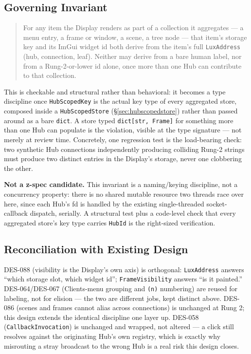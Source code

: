 \documentclass[a4paper,10pt]{article}
\begin{document}
\subsection{Governing Invariant}

\begin{quote}
For any item the Display renders as part of a collection it aggregates ---
a menu entry, a frame or window, a scene, a tree node --- that item's
storage key and its ImGui widget id both derive from the item's full
\texttt{LuxAddress} (hub, connection, leaf).  Neither may derive from a
bare human label, nor from a Rung-2-or-lower id alone, once more than one
Hub can contribute to that collection.
\end{quote}

This is checkable and structural rather than behavioral: it becomes a type
discipline once \texttt{HubScopedKey} is the actual key type of every
aggregated store, composed inside a \texttt{HubScopedStore}
(\S\ref{sec:hubscopedstore}) rather than passed around as a bare
\texttt{dict}.  A store typed \texttt{dict[str, Frame]} for something more
than one Hub can populate is the violation, visible at the type signature
--- not merely at review time.  Concretely, one regression test is the
load-bearing check: two synthetic Hub connections independently producing
colliding Rung-2 strings must produce two distinct entries in the
Display's storage, never one clobbering the other.

\textbf{Not a z-spec candidate.}  This invariant is a naming/keying
discipline, not a concurrency property: there is no shared mutable
resource two threads race over here, since each Hub's fd is handled by the
existing single-threaded socket-callback dispatch, serially.  A structural
test plus a code-level check that every aggregated store's key type
carries \texttt{HubId} is the right-sized verification.

\subsection{Reconciliation with Existing Design}

DES-088 (visibility is the Display's own axis) is orthogonal:
\texttt{LuxAddress} answers ``which storage slot, which widget id'';
\texttt{FrameVisibility} answers ``is it painted.''  DES-064/DES-067
(Clients-menu grouping and \texttt{(n)} numbering) are reused for
labeling, not for elision --- the two are different jobs, kept distinct
above.  DES-086 (scenes and frames cannot alias across connections) is
unchanged at Rung 2; this design extends the identical discipline one
layer up.  DES-058 (\texttt{CallbackInvocation}) is unchanged and wrapped,
not altered --- a click still resolves against the originating Hub's own
registry, which is exactly why misrouting a stray broadcast to the wrong
Hub is a real risk this design closes.
\end{document}

